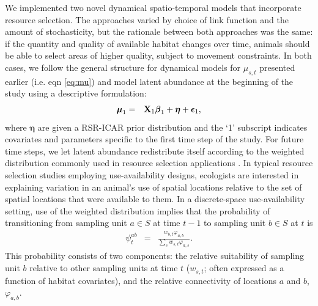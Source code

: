 \documentclass[times,mee,doublespace,]{besauth2}
\begin{document}
We implemented two novel dynamical spatio-temporal models that incorporate resource selection.  The approaches varied by choice of link function and the amount of stochasticity, but the rationale between both approaches was the same: if the quantity and quality of available habitat changes over time, animals should be able to select areas of higher quality, subject to movement constraints.
    In both cases, we follow the general structure for dynamical models for $\mu_{s,t}$ presented earlier (i.e. eqn \ref{eq:mu}) and model latent abundance at the beginning of the study using a descriptive formulation:
\begin{eqnarray*}
  \boldsymbol{\mu}_{1} & = & {\bf X}_{1} \boldsymbol{\beta}_1 + \boldsymbol{\eta} + \boldsymbol{\epsilon}_1,
\end{eqnarray*}
where $\boldsymbol{\eta}$ are given a RSR-ICAR prior distribution and the `1' subscript indicates covariates and parameters specific to the first time step of the study.  For future time steps, we let latent abundance redistribute itself according to the weighted distribution commonly used in resource selection applications \citep[cf.][]{PatilRao1978,LeleKeim2006}.  In typical resource selection studies employing use-availability designs, ecologists are interested in explaining variation in an animal's use of spatial locations relative to the set of spatial locations that were available to them.  In a discrete-space use-availability setting, use of the weighted distribution implies that the probability of transitioning from sampling unit $a \in S$ at time $t-1$ to sampling unit $b \in S$ at $t$ is
\begin{eqnarray}
  \psi^{ab}_t & = & \frac{w_{b,t} \varphi_{a,b}}{\sum_s w_{s,t} \varphi_{a,s}}. \label{eq:psi}
\end{eqnarray}
This probability consists of two components: the relative suitability of sampling unit $b$ relative to other sampling units at time $t$ ($w_{s,t}$; often expressed as a function of habitat covariates), and the relative connectivity of locations $a$ and $b$, $\varphi_{a,b}$.
\end{document}
